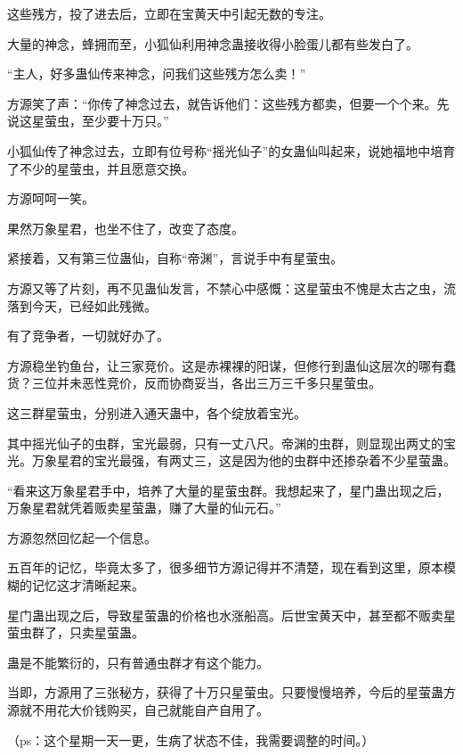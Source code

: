 \begin{this_body}
这些残方，投了进去后，立即在宝黄天中引起无数的专注。

大量的神念，蜂拥而至，小狐仙利用神念蛊接收得小脸蛋儿都有些发白了。

“主人，好多蛊仙传来神念，问我们这些残方怎么卖！”

方源笑了声：“你传了神念过去，就告诉他们：这些残方都卖，但要一个个来。先说这星萤虫，至少要十万只。”

小狐仙传了神念过去，立即有位号称“摇光仙子”的女蛊仙叫起来，说她福地中培育了不少的星萤虫，并且愿意交换。

方源呵呵一笑。

果然万象星君，也坐不住了，改变了态度。

紧接着，又有第三位蛊仙，自称“帝渊”，言说手中有星萤虫。

方源又等了片刻，再不见蛊仙发言，不禁心中感慨：这星萤虫不愧是太古之虫，流落到今天，已经如此残微。

有了竞争者，一切就好办了。

方源稳坐钓鱼台，让三家竞价。这是赤裸裸的阳谋，但修行到蛊仙这层次的哪有蠢货？三位并未恶性竞价，反而协商妥当，各出三万三千多只星萤虫。

这三群星萤虫，分别进入通天蛊中，各个绽放着宝光。

其中摇光仙子的虫群，宝光最弱，只有一丈八尺。帝渊的虫群，则显现出两丈的宝光。万象星君的宝光最强，有两丈三，这是因为他的虫群中还掺杂着不少星萤蛊。

“看来这万象星君手中，培养了大量的星萤虫群。我想起来了，星门蛊出现之后，万象星君就凭着贩卖星萤蛊，赚了大量的仙元石。”

方源忽然回忆起一个信息。

五百年的记忆，毕竟太多了，很多细节方源记得并不清楚，现在看到这里，原本模糊的记忆这才清晰起来。

星门蛊出现之后，导致星萤蛊的价格也水涨船高。后世宝黄天中，甚至都不贩卖星萤虫群了，只卖星萤蛊。

蛊是不能繁衍的，只有普通虫群才有这个能力。

当即，方源用了三张秘方，获得了十万只星萤虫。只要慢慢培养，今后的星萤蛊方源就不用花大价钱购买，自己就能自产自用了。

（ps：这个星期一天一更，生病了状态不佳，我需要调整的时间。）

\end{this_body}

